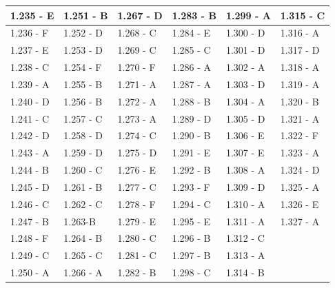 \documentclass[10pt]{article}
\begin{document}
\begin{center}
\begin{tabular}{|l|l|l|l|l|l|}
\hline
1.235 - E & 1.251 - B & 1.267 - D & 1.283 - B & 1.299 - A & 1.315 - C \\
\hline
1.236 - F & 1.252 - D & 1.268 - C & 1.284 - E & 1.300 - D & 1.316 - A \\
\hline
1.237 - E & 1.253 - D & 1.269 - C & 1.285 - C & 1.301 - D & 1.317 - D \\
\hline
1.238 - C & 1.254 - F & 1.270 - F & 1.286 - A & 1.302 - A & 1.318 - A \\
\hline
1.239 - A & 1.255 - B & 1.271 - A & 1.287 - A & 1.303 - D & 1.319 - A \\
\hline
1.240 - D & 1.256 - B & 1.272 - A & 1.288 - B & 1.304 - A & 1.320 - B \\
\hline
1.241 - C & 1.257 - C & 1.273 - A & 1.289 - D & 1.305 - D & 1.321 - A \\
\hline
1.242 - D & 1.258 - D & 1.274 - C & 1.290 - B & 1.306 - E & 1.322 - F \\
\hline
1.243 - A & 1.259 - D & 1.275 - D & 1.291 - E & 1.307 - E & 1.323 - A \\
\hline
1.244 - B & 1.260 - C & 1.276 - E & 1.292 - B & 1.308 - A & 1.324 - D \\
\hline
1.245 - D & 1.261 - B & 1.277 - C & 1.293 - F & 1.309 - D & 1.325 - A \\
\hline
1.246 - C & 1.262 - C & 1.278 - F & 1.294 - C & 1.310 - A & 1.326 - E \\
\hline
1.247 - B & 1.263-B & 1.279 - E & 1.295 - E & 1.311 - A & 1.327 - A \\
\hline
1.248 - F & 1.264 - B & 1.280 - C & 1.296 - B & 1.312 - C &  \\
\hline
1.249 - C & 1.265 - C & 1.281 - C & 1.297 - B & 1.313 - A &  \\
\hline
1.250 - A & 1.266 - A & 1.282 - B & 1.298 - C & 1.314 - B &  \\
\hline
\end{tabular}
\end{center}
\end{document}
